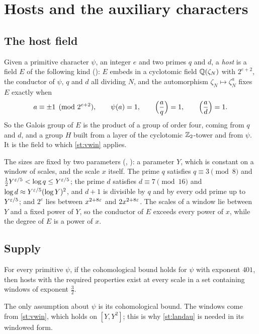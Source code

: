 \section{Hosts and the auxiliary characters}\label{sec:hosts}

\subsection{The host field}
Given a primitive character $\psi$, an integer $e$ and two primes $q$ and $d$, a \emph{host} is
a field $E$ of the following kind \lvS{} (): $E$ embeds in a cyclotomic field
$\mathbb{Q}(\zeta_N)$ with $2^{e+2}$, the conductor of $\psi$, $q$ and $d$ all dividing $N$, and the
automorphism $\zeta_N\mapsto\zeta_N^{a}$ fixes $E$ exactly when
\[
a\equiv\pm1\pmod{2^{e+2}},\qquad \psi(a)=1,\qquad \Bigl(\frac aq\Bigr)=1,\qquad
\Bigl(\frac ad\Bigr)=1 .
\]
So the Galois group of $E$ is the product of a group of order four, coming from $q$ and $d$,
and a group $H$ built from a layer of the cyclotomic $\mathbb{Z}_2$-tower and from $\psi$. It is the
field to which \cref{st:vwin} applies.

The sizes are fixed by two parameters \lvS{} (, ): a parameter $Y$,
which is constant on a window of scales, and the scale $x$ itself. The prime
$q$ satisfies $q\equiv3\pmod8$ and $\tfrac12Y^{\varepsilon/5}<\log q\le Y^{\varepsilon/5}$; the prime $d$
satisfies $d\equiv7\pmod{16}$ and $\log d\approx Y^{\varepsilon/5}(\log Y)^2$, and $d+1$ is divisible
by $q$ and by every odd prime up to $Y^{\varepsilon/5}$; and $2^e$ lies between $x^{2+8\varepsilon}$ and
$2x^{2+8\varepsilon}$. The scales of a window lie between $Y$ and a fixed power of $Y$, so the
conductor of $E$ exceeds every power of $x$, while the degree of $E$ is a power of $x$.

\subsection{Supply}
\begin{statement}\label{st:supply}
For every primitive $\psi$, if the cohomological bound holds for $\psi$ with exponent $401$,
then hosts with the required properties exist at every scale in a set containing windows of
exponent $\tfrac32$.
\end{statement}
The only assumption about $\psi$ is its cohomological bound. The windows come from
\cref{st:vwin}, which holds on $[Y,Y^2]$; this is why \cref{st:landau} is needed in its
windowed form.

